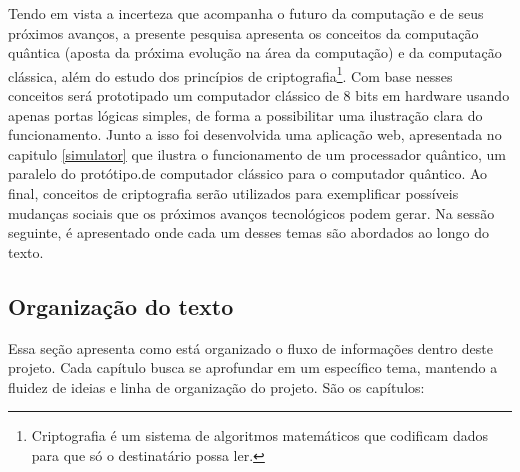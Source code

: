 Tendo em vista a incerteza que acompanha o futuro da computação e de seus próximos avanços, a presente pesquisa apresenta os conceitos da computação quântica (aposta da próxima evolução na área da computação) e da computação clássica, além do estudo dos princípios de criptografia\footnote{Criptografia é um sistema de algoritmos matemáticos que codificam dados para que só o destinatário possa ler.}. Com base nesses conceitos será prototipado um computador clássico de 8 bits em hardware usando apenas portas lógicas simples, de forma a possibilitar uma ilustração clara do funcionamento. Junto a isso foi desenvolvida uma aplicação web, apresentada no capitulo \ref{simulator} que ilustra o funcionamento de um processador quântico, um paralelo do protótipo.de computador clássico para o computador quântico. Ao final, conceitos de criptografia serão utilizados para exemplificar possíveis mudanças sociais que os próximos avanços tecnológicos podem gerar. Na sessão seguinte, é apresentado onde cada um desses temas são abordados ao longo do texto.

\subsection{Organização do texto}
Essa seção apresenta como está organizado o fluxo de informações dentro deste projeto. Cada capítulo busca se aprofundar em um específico tema, mantendo a fluidez de ideias e linha de organização do projeto. São os capítulos:

